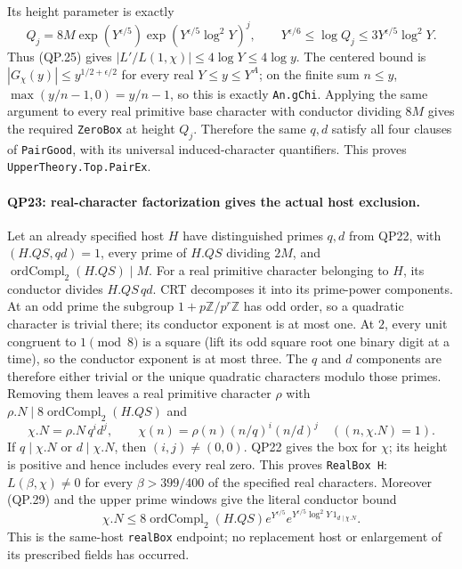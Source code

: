 Its height parameter is exactly
\[
 Q_j=8M\exp(Y^{\epsilon/5})
            \exp(Y^{\epsilon/5}\log^2Y)^j,\qquad
 Y^{\epsilon/6}\le\log Q_j\le3Y^{\epsilon/5}\log^2Y.  \tag{QP.28}
\]
Thus (QP.25) gives $|L'/L(1,\chi)|\le4\log Y\le4\log y$.
The centered bound is $|G_\chi(y)|\le y^{1/2+\epsilon/2}$
for every real $Y\le y\le Y^A$; on the finite sum $n\le y$,
$\max(y/n-1,0)=y/n-1$, so this is exactly \texttt{An.gChi}.
Applying the same argument to every real primitive base character with
conductor dividing $8M$ gives the required \texttt{ZeroBox} at height
$Q_j$.  Therefore the same $q,d$ satisfy all four clauses of
\texttt{PairGood}, with its universal induced-character quantifiers.
This proves \texttt{UpperTheory.Top.PairEx}.

\paragraph{QP23: real-character factorization gives the actual host exclusion.}
Let an already specified host $H$ have distinguished primes $q,d$ from
QP22, with $(H.QS,qd)=1$, every prime of $H.QS$ dividing $2M$, and
$\operatorname{ordCompl}_2(H.QS)\mid M$.
For a real primitive character belonging to $H$, its conductor divides
$H.QS\,qd$.  CRT decomposes it into its prime-power components.
At an odd prime the subgroup $1+p\mathbb Z/p^r\mathbb Z$ has odd
order, so a quadratic character is trivial there; its conductor
exponent is at most one.  At $2$, every unit congruent to $1\pmod8$
is a square (lift its odd square root one binary digit at a time), so
the conductor exponent is at most three.
The $q$ and $d$ components are therefore either trivial or the unique
quadratic characters modulo those primes.  Removing them leaves a
real primitive character $\rho$ with
$\rho.N\mid8\operatorname{ordCompl}_2(H.QS)$ and
\[
 \chi.N=\rho.N\,q^i d^j,\qquad
 \chi(n)=\rho(n)(n/q)^i(n/d)^j\quad((n,\chi.N)=1).    \tag{QP.29}
\]
If $q\mid\chi.N$ or $d\mid\chi.N$, then $(i,j)\ne(0,0)$.
QP22 gives the box for $\chi$; its height is positive and hence includes
every real zero.  This proves \texttt{RealBox H}:
$L(\beta,\chi)\ne0$ for every $\beta>399/400$ of the specified real
characters.  Moreover (QP.29) and the upper prime windows give the
literal conductor bound
\[
 \chi.N\le8\operatorname{ordCompl}_2(H.QS)
          e^{Y^{\epsilon/5}}
          e^{Y^{\epsilon/5}\log^2Y\,1_{d\mid\chi.N}}. \tag{QP.30}
\]
This is the same-host \texttt{realBox} endpoint; no replacement host
or enlargement of its prescribed fields has occurred.

